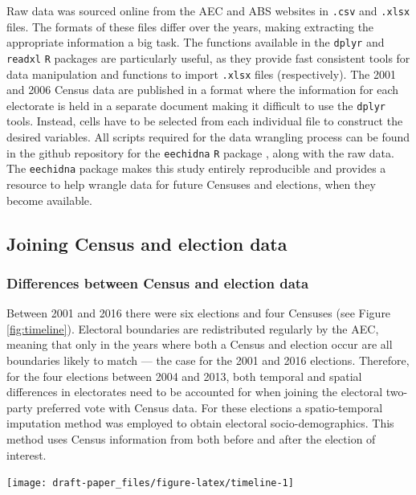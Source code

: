 \documentclass[11pt,a4paper,]{article}
\let\origfigure\figure
\let\endorigfigure\endfigure
\renewenvironment{figure}[1][2] {
    \expandafter\origfigure\expandafter[htbp]
} {
    \endorigfigure
}
\begin{document}
Raw data was sourced online from the AEC and ABS websites in
\texttt{.csv} and \texttt{.xlsx} files. The formats of these files
differ over the years, making extracting the appropriate information a
big task. The functions available in the \texttt{dplyr} \autocite{dplyr}
and \texttt{readxl} \autocite{readxl} \texttt{R} packages are
particularly useful, as they provide fast consistent tools for data
manipulation and functions to import \texttt{.xlsx} files
(respectively). The 2001 and 2006 Census data are published in a format
where the information for each electorate is held in a separate document
making it difficult to use the \texttt{dplyr} tools. Instead, cells have
to be selected from each individual file to construct the desired
variables. All scripts required for the data wrangling process can be
found in the github repository for the \texttt{eechidna} \texttt{R}
package \autocite{eechidna}, along with the raw data. The
\texttt{eechidna} package makes this study entirely reproducible and
provides a resource to help wrangle data for future Censuses and
elections, when they become available.

\subsection{Joining Census and election
data}\label{joining-census-and-election-data}

\subsubsection{Differences between Census and election
data}\label{differences-between-census-and-election-data}

Between 2001 and 2016 there were six elections and four Censuses (see
Figure \ref{fig:timeline}). Electoral boundaries are redistributed
regularly by the AEC, meaning that only in the years where both a Census
and election occur are all boundaries likely to match --- the case for
the 2001 and 2016 elections. Therefore, for the four elections between
2004 and 2013, both temporal and spatial differences in electorates need
to be accounted for when joining the electoral two-party preferred vote
with Census data. For these elections a spatio-temporal imputation
method was employed to obtain electoral socio-demographics. This method
uses Census information from both before and after the election of
interest.

\begin{figure}[h]

{\centering \texttt{[image: draft-paper\_files/figure-latex/timeline-1]} 

}

\caption{Timeline of Australian elections and Censuses. They do not always occur in the same year.}\label{fig:timeline}
\end{figure}
\end{document}
